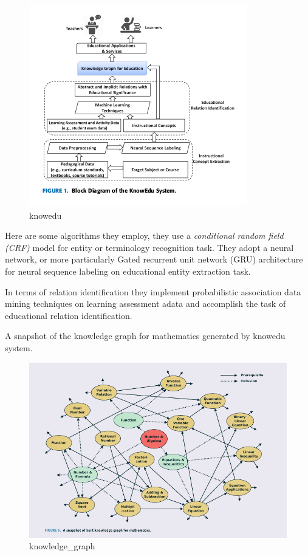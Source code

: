 \documentclass{acm_proc_article-sp}
\begin{document}
\begin{figure}
\centering
\includegraphics{img/knowedu.png}
\caption{knowedu}
\end{figure}

Here are some algorithms they employ, they use a \emph{conditional
random field (CRF)} model for entity or terminology recognition task.
They adopt a neural network, or more particularly Gated recurrent unit
network (GRU) architecture for neural sequence labeling on educational
entity extraction task.

In terms of relation identification they implement probabilistic
association data mining techniques on learning assessment adata and
accomplish the task of educational relation identification.

A snapshot of the knowledge graph for mathematics generated by knowedu
system.

\begin{figure}
\centering
\includegraphics{img/kg.png}
\caption{knowledge\_graph}
\end{figure}
\end{document}
